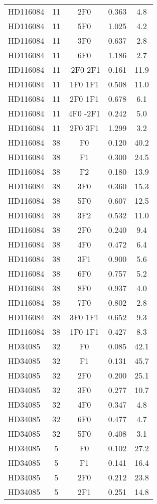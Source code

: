 \begin{table*}
\begin{tabular}{l c c c c}
HD116084 & 11 & 2F0 & 0.363 & 4.8\\ 
HD116084 & 11 & 5F0 & 1.025 & 4.2\\ 
HD116084 & 11 & 3F0 & 0.637 & 2.8\\ 
HD116084 & 11 & 6F0 & 1.186 & 2.7\\ 
HD116084 & 11 & -2F0 2F1 & 0.161 & 11.9\\ 
HD116084 & 11 & 1F0 1F1 & 0.508 & 11.0\\ 
HD116084 & 11 & 2F0 1F1 & 0.678 & 6.1\\ 
HD116084 & 11 & 4F0 -2F1 & 0.242 & 5.0\\ 
HD116084 & 11 & 2F0 3F1 & 1.299 & 3.2\\ 
\hline
HD116084 & 38 & F0 & 0.120 & 40.2\\ 
HD116084 & 38 & F1 & 0.300 & 24.5\\ 
HD116084 & 38 & F2 & 0.180 & 13.9\\ 
HD116084 & 38 & 3F0 & 0.360 & 15.3\\ 
HD116084 & 38 & 5F0 & 0.607 & 12.5\\ 
HD116084 & 38 & 3F2 & 0.532 & 11.0\\ 
HD116084 & 38 & 2F0 & 0.240 & 9.4\\ 
HD116084 & 38 & 4F0 & 0.472 & 6.4\\ 
HD116084 & 38 & 3F1 & 0.900 & 5.6\\ 
HD116084 & 38 & 6F0 & 0.757 & 5.2\\ 
HD116084 & 38 & 8F0 & 0.937 & 4.0\\ 
HD116084 & 38 & 7F0 & 0.802 & 2.8\\ 
HD116084 & 38 & 3F0 1F1 & 0.652 & 9.3\\ 
HD116084 & 38 & 1F0 1F1 & 0.427 & 8.3\\ 
\hline
HD34085 & 32 & F0 & 0.085 & 42.1\\ 
HD34085 & 32 & F1 & 0.131 & 45.7\\ 
HD34085 & 32 & 2F0 & 0.200 & 25.1\\ 
HD34085 & 32 & 3F0 & 0.277 & 10.7\\ 
HD34085 & 32 & 4F0 & 0.347 & 4.8\\ 
HD34085 & 32 & 6F0 & 0.477 & 4.7\\ 
HD34085 & 32 & 5F0 & 0.408 & 3.1\\ 
\hline
HD34085 & 5 & F0 & 0.102 & 27.2\\ 
HD34085 & 5 & F1 & 0.141 & 16.4\\ 
HD34085 & 5 & 2F0 & 0.212 & 23.8\\ 
HD34085 & 5 & 2F1 & 0.251 & 14.8\\ 

\end{tabular}
\end{table*}
